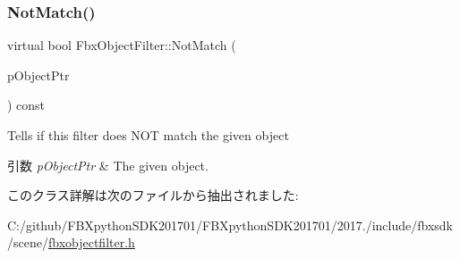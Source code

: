 \subsubsection{\texorpdfstring{Not\+Match()}{NotMatch()}}
{\footnotesize\ttfamily virtual bool Fbx\+Object\+Filter\+::\+Not\+Match (\begin{DoxyParamCaption}\item[{const \hyperlink{class_fbx_object}{Fbx\+Object} $\ast$}]{p\+Object\+Ptr }\end{DoxyParamCaption}) const\hspace{0.3cm}{\ttfamily [virtual]}}

Tells if this filter does N\+OT match the given object 
\begin{DoxyParams}{引数}
{\em p\+Object\+Ptr} & The given object. \\
\hline
\end{DoxyParams}


このクラス詳解は次のファイルから抽出されました\+:\begin{DoxyCompactItemize}
\item 
C\+:/github/\+F\+B\+Xpython\+S\+D\+K201701/\+F\+B\+Xpython\+S\+D\+K201701/2017./include/fbxsdk/scene/\hyperlink{fbxobjectfilter_8h}{fbxobjectfilter.\+h}\end{DoxyCompactItemize}

